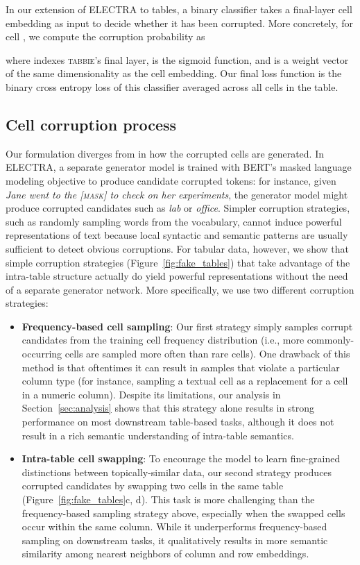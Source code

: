 \documentclass[11pt]{article}
\newcommand{\name}[0]{\textsc{tabbie}}
\begin{document}
In our extension of ELECTRA to tables, a binary classifier takes a final-layer cell embedding as input to decide whether it has been corrupted. More concretely, for cell , we compute the corruption probability as 



where  indexes \name's final layer,  is the sigmoid function, and  is a weight vector of the same dimensionality as the cell embedding. Our final loss function is the binary cross entropy loss of this classifier averaged across all cells in the table. 



\subsection{Cell corruption process}
\label{subsec:corruption}
Our formulation diverges from \citet{Clark2020ELECTRA:} in how the corrupted cells are generated. In ELECTRA, a separate generator model is trained with BERT's masked language modeling objective to produce candidate corrupted tokens: for instance, given \emph{Jane went to the \textsc{[mask]} to check on her experiments}, the generator model might produce corrupted candidates such as \emph{lab} or \emph{office}. Simpler corruption strategies, such as randomly sampling words from the vocabulary, cannot induce powerful representations of text because local syntactic and semantic patterns are usually sufficient to detect obvious corruptions. For tabular data, however, we show that simple corruption strategies (Figure~\ref{fig:fake_tables}) that take advantage of the intra-table structure actually do yield powerful representations without the need of a separate generator network. More specifically, we use two different corruption strategies:
 
\begin{itemize} 
    \item \textbf{Frequency-based cell sampling}: Our first strategy simply samples corrupt candidates from the training cell frequency distribution (i.e., more commonly-occurring cells are sampled more often than rare cells). One drawback of this method is that oftentimes it can result in samples that violate a particular column type (for instance, sampling a textual cell as a replacement for a cell in a numeric column). Despite its limitations, our analysis in Section~\ref{sec:analysis} shows that this strategy alone results in strong performance on most downstream table-based tasks, although it does not result in a rich semantic understanding of intra-table semantics. 
    
    \item \textbf{Intra-table cell swapping}: To encourage the model to learn fine-grained distinctions between topically-similar data, our second strategy produces corrupted candidates by swapping two cells in the same table (Figure~\ref{fig:fake_tables}c, d). This task is more challenging than the frequency-based sampling strategy above, especially when the swapped cells occur within the same column. While it underperforms frequency-based sampling on downstream tasks, it qualitatively results in more semantic similarity among nearest neighbors of column and row embeddings.
\end{itemize}
\end{document}
